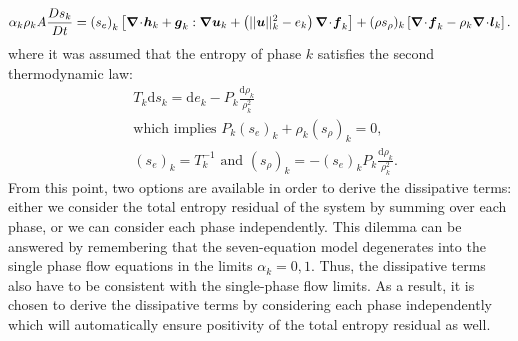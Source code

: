 %
\begin{equation}\label{eq:ent-res-7-eqn-diss-terms}
\alpha_k \rho_k A \frac{Ds_k}{Dt} = \left(s_e\right)_k \left[ \div \mbold h_k + \mbold g_k : \grad \mbold u_k +  \left( || \mbold u ||^2_k - e_k\right) \div \mbold f_k  \right] + (\rho s_\rho)_k \left[ \div \mbold f_k - \rho_k \div \mbold l_k \right].
\end{equation}
%
where it was assumed that the entropy of phase $k$ satisfies the second thermodynamic law: 
%
\begin{align}\label{eq:2nd-therm-laws-sect4}
&T_k \text{d} s_k = \text{d}e_k - P_k\frac{\text{d}\rho_k}{\rho_k^2} \nonumber \\
& \text{which implies } P_k (s_e)_k + \rho_k (s_\rho)_k = 0, \\
& (s_e)_k = T_k^{-1} \text{ and } (s_\rho)_k = - (s_e)_k P_k \frac{\text{d}\rho_k}{\rho_k^2}. \nonumber
\end{align}
% 
From this point, two options are available in order to derive the dissipative terms: either we consider the total entropy residual of the system by summing  over each phase, or we can consider each phase independently. This dilemma can be answered by remembering that the seven-equation model degenerates into the single phase flow equations in the limits $\alpha_k = 0,1$. Thus, the dissipative terms also have to be consistent with the single-phase flow limits. As a result, it is chosen to derive the dissipative terms by considering each phase independently which will automatically ensure positivity of the total entropy residual as well.

